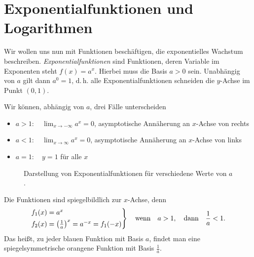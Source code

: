 \thispagestyle{plain}
\section{Exponentialfunktionen und Logarithmen}

Wir wollen uns nun mit Funktionen beschäftigen, die exponentielles Wachstum beschreiben. \emph{Exponentialfunktionen} sind Funktionen, deren Variable im Exponenten steht $f(x) = a^x$. Hierbei muss die Basis $a > 0$ sein. Unabhängig von $a$ gilt dann $a^0 = 1$, d.\,h. alle Exponentialfunktionen schneiden die $y$-Achse im Punkt $(0,1)$. 

Wir können, abhängig von $a$, drei Fälle unterscheiden 
\begin{itemize}
    \item $a > 1: \quad \lim_{x\to -\infty} a^x = 0$, asymptotische Annäherung an $x$-Achse von rechts
    \item $a < 1: \quad \lim_{x\to \infty} a^x = 0$, asymptotische Annäherung an $x$-Achse von links 
    \item $a = 1: \quad y=1$ für alle $x$
\end{itemize}

\begin{figure}[htp]
    \centering
    \caption{Darstellung von Exponentialfunktionen für verschiedene Werte von $a$.}
\end{figure} 
Die Funktionen sind spiegelbildlich zur $x$-Achse, denn 
\begin{align}
    \begin{rcases}
        f_1(x) = a^x \\
        f_2(x) = \qty(\frac{1}{a})^x = a^{-x} = f_1(-x) 
    \end{rcases} \qq{wenn} a >1, \qq{dann} \frac{1}{a} < 1.
\end{align}
Das heißt, zu jeder \textcolor{FSUblau}{blauen} Funktion mit Basis $a$, findet man eine spiegelsymmetrische \textcolor{PAForange}{orangene} Funktion mit Basis $\frac{1}{a}$.

